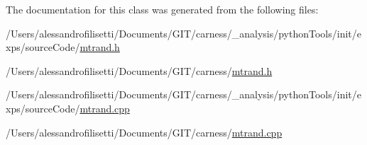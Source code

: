 The documentation for this class was generated from the following files\-:\begin{DoxyCompactItemize}
\item 
/\-Users/alessandrofilisetti/\-Documents/\-G\-I\-T/carness/\-\_\-analysis/python\-Tools/init/exps/source\-Code/\hyperlink{a00072}{mtrand.\-h}\item 
/\-Users/alessandrofilisetti/\-Documents/\-G\-I\-T/carness/\hyperlink{a00073}{mtrand.\-h}\item 
/\-Users/alessandrofilisetti/\-Documents/\-G\-I\-T/carness/\-\_\-analysis/python\-Tools/init/exps/source\-Code/\hyperlink{a00070}{mtrand.\-cpp}\item 
/\-Users/alessandrofilisetti/\-Documents/\-G\-I\-T/carness/\hyperlink{a00071}{mtrand.\-cpp}\end{DoxyCompactItemize}

